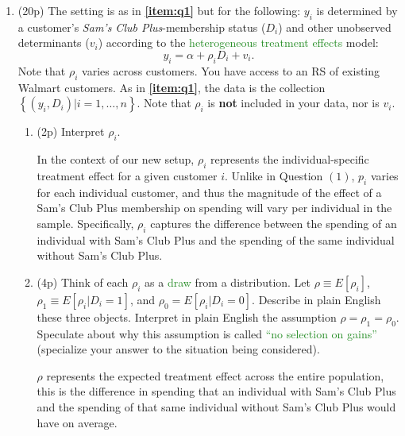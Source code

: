 \documentclass{article}
\begin{document}
\begin{enumerate}[label=\textbf{Q\arabic{enumi}}.,ref=Q\arabic{enumi}, wide=0pt, itemsep=1em, topsep=5pt]
    \item (20p) The setting is as in \textbf{\ref{item:q1}} but for the following: $y_{i}$ is determined by a customer's \textit{Sam's Club Plus}-membership status ($D_{i}$) and other unobserved determinants ($v _{i}$) according to the \textcolor{ForestGreen}{heterogeneous treatment effects} model: \label{item:q3}
    \begin{equation}\label{model_2}
    y_{i}=\alpha +\rho _{i}D_{i}+v_{i}.
    \end{equation}
Note that $\rho _{i}$ varies across customers. You have access to an RS of existing Walmart customers. As in \textbf{\ref{item:q1}}, the data is the collection $\left\{ \left( y_{i},D_{i}\right) |i=1,\ldots,n\right\} $. Note that $\rho _{i}$ is \textbf{not} included in your data, nor is $v_i$.

    \begin{enumerate}
        \item (2p) Interpret $\rho _{i}$.
        \begin{solution}
        {
            In the context of our new setup, $\rho_i$ represents the individual-specific treatment effect for a given customer $i$. Unlike in Question $(1)$, $p_i$ varies for each individual customer, and thus the magnitude of the effect of a Sam's Club Plus membership on spending will vary per individual in the sample. Specifically, $\rho_i$ captures the difference between the spending of an individual with Sam's Club Plus and the spending of the same individual without Sam's Club Plus.
        }
        \end{solution}
        \item (4p) Think of each $\rho _{i}$ as a \textcolor{ForestGreen}{draw} from a distribution. Let $\rho \equiv E\left[ \rho _{i}\right] $, $\rho_1 \equiv E\left[ \rho _{i}|D_{i}=1\right]$, and $\rho_0 = E\left[ \rho _{i}|D_{i}=0\right]$. Describe in plain English these three objects. Interpret in plain English the assumption $\rho=\rho_1=\rho_0 $. Speculate about why this assumption is called \textcolor{ForestGreen}{``no selection on gains''} (specialize your answer to the situation being considered).\label{item:q3-att}
        \begin{solution}
        {
            $\rho$ represents the expected treatment effect across the entire population, this is the difference in spending that an individual with Sam's Club Plus and the spending of that same individual without Sam's Club Plus would have on average. 
            
}
\end{solution}
\end{enumerate}
\end{enumerate}
\end{document}
